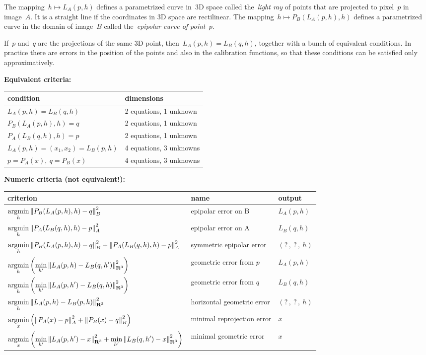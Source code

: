 The mapping~$h\mapsto L_A(p,h)$ defines a parametrized curve in~3D space
called the~\emph{light ray} of points that are projected to pixel~$p$ in
image~$A$.
It is a straight line if the coordinates in 3D space are rectilinear.
The mapping~$h\mapsto P_B(L_A(p,h),h)$ defines a parametrized curve in the
domain of image~$B$ called the~\emph{epipolar curve of point~$p$}.

If~$p$ and~$q$ are the projections of the same 3D point,
then~$L_A(p,h)=L_B(q,h)$, together with a bunch of equivalent conditions.
In practice there are errors in the position of the points and also in the
calibration functions, so that these conditions can be satisfied only
approximatively.



{\bf Equivalent criteria:}

\begin{tabular}{l|l}
condition & dimensions \\
\hline
$L_A(p,h)=L_B(q,h)$  & 2 equations, 1 unknown\\
$P_B(L_A(p,h),h)=q$  & 2 equations, 1 unknown\\
$P_A(L_B(q,h),h)=p$  & 2 equations, 1 unknown\\
$L_A(p,h)=(x_1,x_2)=L_B(p,h)$ & 4 equations, 3 unknowns\\
$p=P_A(x),\ q=P_B(x)$ & 4 equations, 3 unknowns\\
\end{tabular}

{\bf Numeric criteria (not equivalent!):}

\begin{tabular}{l|l|l}
	criterion & name & output\\
	\hline
	$\displaystyle\mathop{\rm argmin}_h\displaystyle\left\|P_B(L_A(p,h),h)-q\right\|_B^2$ &
	epipolar error on B & $L_A(p,h)$\\
	$\displaystyle\mathop{\rm argmin}_h\left\|P_A(L_B(q,h),h)-p\right\|_A^2$ &
	epipolar error on A &$L_B(q,h)$\\
	$\displaystyle\mathop{\rm argmin}_h
	\left\|P_B(L_A(p,h),h)-q\right\|_B^2
	+
	\left\|P_A(L_B(q,h),h)-p\right\|_A^2 $ &
	symmetric epipolar error & $(?\,,\ ?\,,\ h)$ \\
	$\displaystyle\mathop{\rm argmin}_h\left(\min_{h'}\left\|L_A(p,h)-L_B(q,h')\right\|^2_{\mathbf{R}^3}\right)$ &
	geometric error from $p$ & $L_A(p,h)$ \\
	$\displaystyle\mathop{\rm argmin}_h\left(\min_{h'}\left\|L_A(p,h')-L_B(q,h)\right\|^2_{\mathbf{R}^3}\right)$ &
	geometric error from $q$ & $L_B(q,h)$ \\
	$\displaystyle\mathop{\rm argmin}_h\left\|L_A(p,h)-L_B(p,h)\right\|_{\mathbf{R}^3}^2$ &
	horizontal geometric error & $(?\,,\ ?\,,\ h)$ \\
	$\displaystyle\mathop{\rm argmin}_x\left(
		\left\|P_A(x)-p\right\|^2_A
		+
		\left\|P_B(x)-q\right\|^2_B
	\right)$ &
	minimal reprojection error & $x$\\
	$\displaystyle\mathop{\rm argmin}_x\left(
	\min_{h'}\left\|L_A(p,h')-x\right\|^2_{\mathbf{R}^3}
	+
	\min_{h'}\left\|L_B(q,h')-x\right\|^2_{\mathbf{R}^3}
	\right)$ & minimal geometric error & $x$
\end{tabular}

